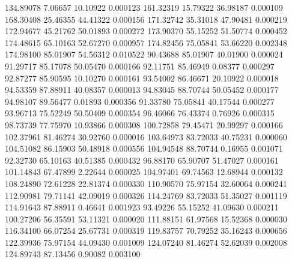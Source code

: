       134.89078        7.06657       10.10922       0.000123
      161.32319       15.79322       36.98187       0.000109
      168.30408       25.46355       44.41322       0.000156
      171.32742       35.31018       47.90481       0.000219
      172.94677       45.21762       50.01893       0.000272
      173.90370       55.15252       51.50774       0.000452
      174.48615       65.10163       52.67270       0.000957
      174.82456       75.05841       53.66220       0.002348
      174.98100       85.01907       54.56312       0.010522
       90.43688       85.01907       40.01900       0.000024
       91.29717       85.17078       50.05470       0.000166
       92.11751       85.46949        0.08377       0.000297
       92.87277       85.90595       10.10270       0.000161
       93.54002       86.46671       20.10922       0.000018
       94.53359       87.88911       40.08357       0.000013
       94.83045       88.70744       50.05452       0.000177
       94.98107       89.56477        0.01893       0.000356
       91.33780       75.05841       40.17544       0.000277
       93.96713       75.52249       50.50409       0.000354
       96.46066       76.43374        0.76926       0.000315
       98.73739       77.75970       10.93866       0.000308
      100.72858       79.45471       20.99297       0.000166
      102.37961       81.46274       30.92760       0.000016
      103.64973       83.72033       40.75231       0.000060
      104.51082       86.15903       50.48918       0.000556
      104.94548       88.70744        0.16955       0.001071
       92.32730       65.10163       40.51385       0.000432
       96.88170       65.90707       51.47027       0.000161
      101.14843       67.47899        2.22644       0.000025
      104.97401       69.74563       12.68944       0.000132
      108.24890       72.61228       22.81374       0.000330
      110.90570       75.97154       32.60064       0.000241
      112.90981       79.71141       42.09019       0.000326
      114.24769       83.72033       51.35027       0.001119
      114.91643       87.88911        0.46641       0.001923
       93.49226       55.15252       41.09630       0.000211
      100.27206       56.35591       53.11321       0.000020
      111.88151       61.97568       15.52368       0.000030
      116.34100       66.07254       25.67731       0.000319
      119.83757       70.79252       35.16243       0.000656
      122.39936       75.97154       44.09430       0.001009
      124.07240       81.46274       52.62039       0.002008
      124.89743       87.13456        0.90082       0.003100
